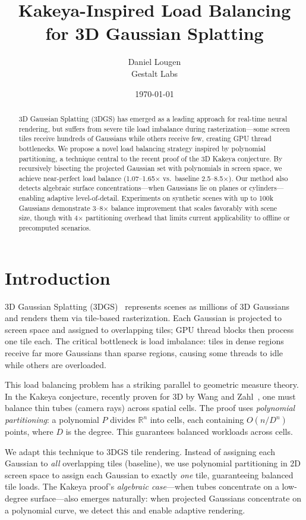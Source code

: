 \documentclass[10pt,twocolumn]{article}
\title{Kakeya-Inspired Load Balancing for 3D Gaussian Splatting}
\author{
  Daniel Lougen \\
  Gestalt Labs
}
\date{\today}
\begin{document}
\maketitle

\begin{abstract}
3D Gaussian Splatting (3DGS) has emerged as a leading approach for real-time neural rendering, but suffers from severe tile load imbalance during rasterization---some screen tiles receive hundreds of Gaussians while others receive few, creating GPU thread bottlenecks. We propose a novel load balancing strategy inspired by polynomial partitioning, a technique central to the recent proof of the 3D Kakeya conjecture. By recursively bisecting the projected Gaussian set with polynomials in screen space, we achieve near-perfect load balance (1.07--1.65$\times$ vs.\ baseline 2.5--8.5$\times$). Our method also detects algebraic surface concentrations---when Gaussians lie on planes or cylinders---enabling adaptive level-of-detail. Experiments on synthetic scenes with up to 100k Gaussians demonstrate 3--8$\times$ balance improvement that scales favorably with scene size, though with 4$\times$ partitioning overhead that limits current applicability to offline or precomputed scenarios.
\end{abstract}

\section{Introduction}

3D Gaussian Splatting (3DGS)~\cite{kerbl2023gaussian} represents scenes as millions of 3D Gaussians and renders them via tile-based rasterization. Each Gaussian is projected to screen space and assigned to overlapping tiles; GPU thread blocks then process one tile each. The critical bottleneck is load imbalance: tiles in dense regions receive far more Gaussians than sparse regions, causing some threads to idle while others are overloaded.

This load balancing problem has a striking parallel to geometric measure theory. In the Kakeya conjecture, recently proven for 3D by Wang and Zahl~\cite{wang2025kakeya}, one must balance thin tubes (camera rays) across spatial cells. The proof uses \emph{polynomial partitioning}: a polynomial $P$ divides $\mathbb{R}^n$ into cells, each containing $O(n/D^n)$ points, where $D$ is the degree. This guarantees balanced workloads across cells.

We adapt this technique to 3DGS tile rendering. Instead of assigning each Gaussian to \emph{all} overlapping tiles (baseline), we use polynomial partitioning in 2D screen space to assign each Gaussian to exactly \emph{one} tile, guaranteeing balanced tile loads. The Kakeya proof's \emph{algebraic case}---when tubes concentrate on a low-degree surface---also emerges naturally: when projected Gaussians concentrate on a polynomial curve, we detect this and enable adaptive rendering.
\end{document}
